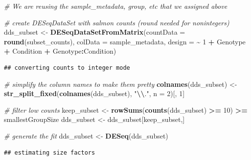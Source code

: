 \documentclass[
]{book}
\newenvironment{Shaded}{\begin{snugshade}}{\end{snugshade}}
\newcommand{\AttributeTok}[1]{\textcolor[rgb]{0.13,0.29,0.53}{#1}}
\newcommand{\CommentTok}[1]{\textcolor[rgb]{0.56,0.35,0.01}{\textit{#1}}}
\newcommand{\DecValTok}[1]{\textcolor[rgb]{0.00,0.00,0.81}{#1}}
\newcommand{\FunctionTok}[1]{\textcolor[rgb]{0.13,0.29,0.53}{\textbf{#1}}}
\newcommand{\NormalTok}[1]{#1}
\newcommand{\OtherTok}[1]{\textcolor[rgb]{0.56,0.35,0.01}{#1}}
\newcommand{\SpecialCharTok}[1]{\textcolor[rgb]{0.81,0.36,0.00}{\textbf{#1}}}
\newcommand{\StringTok}[1]{\textcolor[rgb]{0.31,0.60,0.02}{#1}}
\begin{document}
\begin{Shaded}
\begin{Highlighting}[]
\CommentTok{\# We are reusing the sample\_metadata, group, etc that we assigned above}

\CommentTok{\# create DESeqDataSet with salmon counts (round needed for nonintegers)}
\NormalTok{dds\_subset }\OtherTok{\textless{}{-}} \FunctionTok{DESeqDataSetFromMatrix}\NormalTok{(}\AttributeTok{countData =} \FunctionTok{round}\NormalTok{(subset\_counts),}
                              \AttributeTok{colData =}\NormalTok{ sample\_metadata,}
                              \AttributeTok{design =} \SpecialCharTok{\textasciitilde{}} \DecValTok{1} \SpecialCharTok{+}\NormalTok{ Genotype }\SpecialCharTok{+}\NormalTok{ Condition }\SpecialCharTok{+}\NormalTok{ Genotype}\SpecialCharTok{:}\NormalTok{Condition)}
\end{Highlighting}
\end{Shaded}

\begin{verbatim}
## converting counts to integer mode
\end{verbatim}

\begin{Shaded}
\begin{Highlighting}[]
\CommentTok{\# simplify the column names to make them pretty}
\FunctionTok{colnames}\NormalTok{(dds\_subset) }\OtherTok{\textless{}{-}} \FunctionTok{str\_split\_fixed}\NormalTok{(}\FunctionTok{colnames}\NormalTok{(dds\_subset), }\StringTok{"}\SpecialCharTok{\textbackslash{}\textbackslash{}}\StringTok{."}\NormalTok{, }\AttributeTok{n =} \DecValTok{2}\NormalTok{)[, }\DecValTok{1}\NormalTok{]}

\CommentTok{\# filter low counts}
\NormalTok{keep\_subset }\OtherTok{\textless{}{-}} \FunctionTok{rowSums}\NormalTok{(}\FunctionTok{counts}\NormalTok{(dds\_subset) }\SpecialCharTok{\textgreater{}=} \DecValTok{10}\NormalTok{) }\SpecialCharTok{\textgreater{}=}\NormalTok{ smallestGroupSize}
\NormalTok{dds\_subset }\OtherTok{\textless{}{-}}\NormalTok{ dds\_subset[keep\_subset,]}

\CommentTok{\# generate the fit}
\NormalTok{dds\_subset }\OtherTok{\textless{}{-}} \FunctionTok{DESeq}\NormalTok{(dds\_subset)}
\end{Highlighting}
\end{Shaded}

\begin{verbatim}
## estimating size factors
\end{verbatim}
\end{document}
